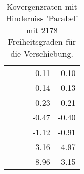 \begin{table}
\begin{tabular}{c|cc|cc|}
\multicolumn{1}{|c|}{} & \multicolumn{1}{|c|}{} & \multicolumn{1}{|c|}{} & \multicolumn{1}{|c|}{     -0.11} & \multicolumn{1}{|c|}{     -0.10} \\ 
\multicolumn{1}{|c|}{} & \multicolumn{1}{|c|}{} & \multicolumn{1}{|c|}{} & \multicolumn{1}{|c|}{     -0.14} & \multicolumn{1}{|c|}{     -0.13} \\ 
\multicolumn{1}{|c|}{} & \multicolumn{1}{|c|}{} & \multicolumn{1}{|c|}{} & \multicolumn{1}{|c|}{     -0.23} & \multicolumn{1}{|c|}{     -0.21} \\ 
\multicolumn{1}{|c|}{} & \multicolumn{1}{|c|}{} & \multicolumn{1}{|c|}{} & \multicolumn{1}{|c|}{     -0.47} & \multicolumn{1}{|c|}{     -0.40} \\ 
\multicolumn{1}{|c|}{} & \multicolumn{1}{|c|}{} & \multicolumn{1}{|c|}{} & \multicolumn{1}{|c|}{     -1.12} & \multicolumn{1}{|c|}{     -0.91} \\ 
\multicolumn{1}{|c|}{} & \multicolumn{1}{|c|}{} & \multicolumn{1}{|c|}{} & \multicolumn{1}{|c|}{     -3.16} & \multicolumn{1}{|c|}{     -4.97} \\ 
\multicolumn{1}{|c|}{} & \multicolumn{1}{|c|}{} & \multicolumn{1}{|c|}{} & \multicolumn{1}{|c|}{     -8.96} & \multicolumn{1}{|c|}{     -3.15} \\ 
\hline 
\end{tabular}\caption{Kovergenzraten mit Hinderniss 'Parabel' mit 2178 Freiheitsgraden für die Verschiebung.}\label{tab:Rate_Parabel_level4}
\end{table} 
